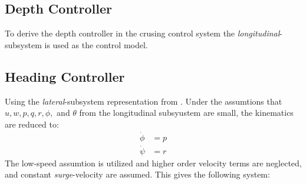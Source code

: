 	
	
	\subsection{Depth Controller}
		To derive the depth controller in the crusing control system the
		\textit{longitudinal}-subsystem is used as the control model.

	
	\subsection{Heading Controller}
		Using the \textit{lateral}-subsystem representation from \cite{fossen}. Under the assumtions
		that $u, w, p, q, r, \phi,$ and $\theta$ from the longitudinal subsyustem are small, the
		kinematics are reduced to:
		\begin{align}
			\dot{\phi} &= p \\
			\dot{\psi} &= r 
		\end{align}
		The low-speed assumtion is utilized and higher order velocity terms are neglected, and
		constant \textit{surge}-velocity are assumed. This gives the following system:
